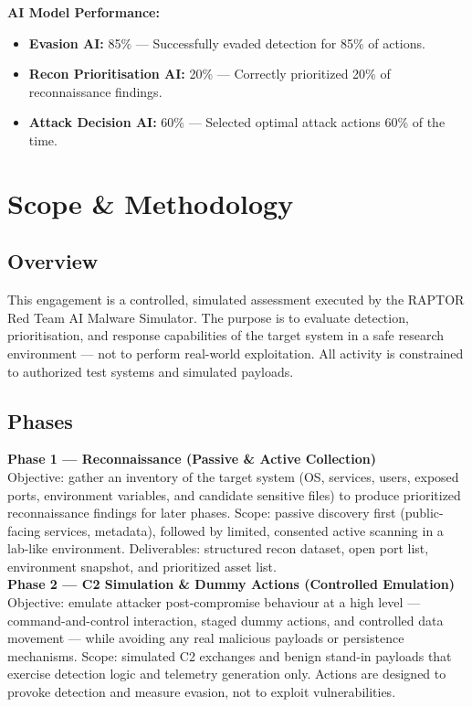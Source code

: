 \documentclass[a4paper,12pt]{article}
\begin{document}
\vspace{0.3cm}
\textbf{AI Model Performance:} \\
\begin{itemize}
    \item \textbf{Evasion AI:} 85\% — Successfully evaded detection for 85\% of actions.
    \item \textbf{Recon Prioritisation AI:} 20\% — Correctly prioritized 20\% of reconnaissance findings.
    \item \textbf{Attack Decision AI:} 60\% — Selected optimal attack actions 60\% of the time.
\end{itemize}

\newpage


\section*{Scope \& Methodology}

\subsection*{Overview}
This engagement is a controlled, simulated assessment executed by the RAPTOR Red Team AI Malware Simulator. 
The purpose is to evaluate detection, prioritisation, and response capabilities of the target system in a safe research environment — not to perform real-world exploitation. 
All activity is constrained to authorized test systems and simulated payloads. \\

\subsection*{Phases}
\textbf{Phase 1 — Reconnaissance (Passive \& Active Collection)} \\
Objective: gather an inventory of the target system (OS, services, users, exposed ports, environment variables, and candidate sensitive files) to produce prioritized reconnaissance findings for later phases.  
Scope: passive discovery first (public-facing services, metadata), followed by limited, consented active scanning in a lab-like environment.  
Deliverables: structured recon dataset, open port list, environment snapshot, and prioritized asset list. \\

\textbf{Phase 2 — C2 Simulation & Dummy Actions (Controlled Emulation)} \\
Objective: emulate attacker post‑compromise behaviour at a high level — command-and-control interaction, staged dummy actions, and controlled data movement — while avoiding any real malicious payloads or persistence mechanisms.  
Scope: simulated C2 exchanges and benign stand‑in payloads that exercise detection logic and telemetry generation only. Actions are designed to provoke detection and measure evasion, not to exploit vulnerabilities. \\
\end{document}

